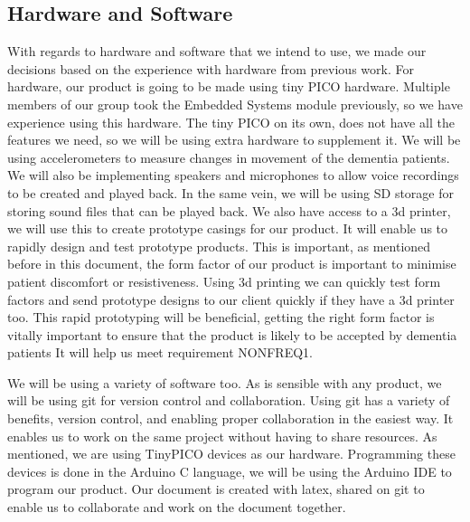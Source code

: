         \subsection{Hardware and Software}
            With regards to hardware and software that we intend to use, we made our decisions based on the experience with
            hardware from previous work. For hardware, our product is going to be made using tiny PICO hardware. Multiple
            members of our group took the Embedded Systems module previously, so we have experience using this hardware. The
            tiny PICO on its own, does not have all the features we need, so we will be using extra hardware to supplement it.
            We will be using accelerometers to measure changes in movement of the dementia patients. We will also be
            implementing speakers and microphones to allow voice recordings to be created and played back. In the same vein, we
            will be using SD storage for storing sound files that can be played back. We also have access to a 3d printer, we
            will use this to create prototype casings for our product. It will enable us to rapidly design and test prototype
            products. This is important, as mentioned before in this document, the form factor of our product is important to
            minimise patient discomfort or resistiveness. Using 3d printing we can quickly test form factors and send prototype
            designs to our client quickly if they have a 3d printer too. This rapid prototyping will be beneficial, getting the
            right form factor is vitally important to ensure that the product is likely to be accepted by dementia patients It
            will help us meet requirement NONFREQ1. 
            
            We will be using a variety of software too. As is sensible with any product,
            we will be using git for version control and collaboration. Using git has a variety of benefits, version control,
            and enabling proper collaboration in the easiest way. It enables us to work on the same project without having to
            share resources. As mentioned, we are using TinyPICO devices as our hardware. Programming these devices is done in
            the Arduino C language, we will be using the Arduino IDE to program our product. Our document is created with latex,
            shared on git to enable us to collaborate and work on the document together. 
            
